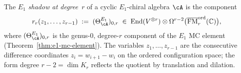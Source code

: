 \begin{definition}
\label{def:e1-shadow-degree-r}
\ClaimStatusDefinitional
{}
The \emph{$E_1$ shadow at degree~$r$} of a cyclic $E_1$-chiral
algebra $\cA$ is the component
\begin{equation}
\label{eq:e1-shadow-degree-r}
r_r(z_1, \ldots, z_{r-1})
\;:=\;
(\Theta_\cA^{E_1})_{0,r}
\;\in\;
\operatorname{End}(V^{\otimes r})
\otimes
\Omega^{r-2}\bigl(
\overline{\mathrm{FM}}_r^{\mathrm{ord}}(\mathbb{C})
\bigr),
\end{equation}
where $(\Theta_\cA^{E_1})_{0,r}$ is the genus-$0$, degree-$r$
component of the $E_1$ MC element
(Theorem~\ref{thm:e1-mc-element}).
The variables $z_1, \ldots, z_{r-1}$ are the consecutive
difference coordinates $z_i = w_{i+1} - w_i$ on the ordered
configuration space; the form degree $r-2 = \dim K_r$ reflects
the quotient by translation and dilation.
\end{definition}

